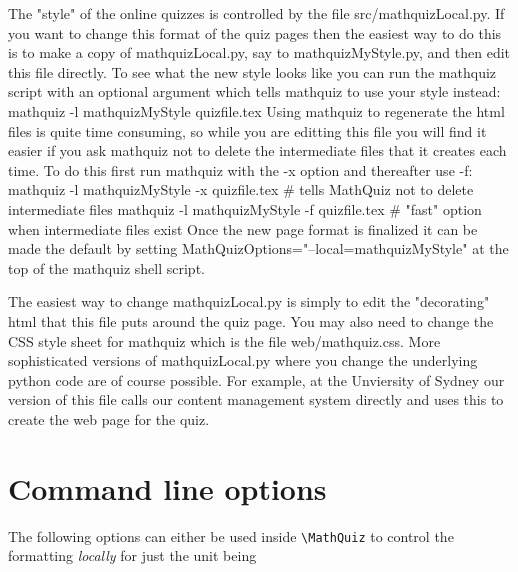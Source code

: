 \documentclass[svgnames]{article}
\def\MathQuiz{\textcolor{blue}{\textsc{MathQuiz}}\xspace}
\begin{document}
The "style" of the online quizzes is controlled by the file src/mathquizLocal.py. If you want to
change this format of the quiz pages then the easiest way to do this is to make a copy of
mathquizLocal.py, say to mathquizMyStyle.py, and then edit this file directly. To see what the
new style looks like you can run the mathquiz script with an optional argument which tells
mathquiz to use your style instead:
    mathquiz -l mathquizMyStyle quizfile.tex
Using mathquiz to regenerate the html files is quite time consuming, so while you are editting this
file you will find it easier if you ask mathquiz not to delete the intermediate files that it
creates each time. To do this first run mathquiz with the -x option and thereafter use -f:
    mathquiz -l mathquizMyStyle -x quizfile.tex   \# tells MathQuiz not to delete intermediate files
    mathquiz -l mathquizMyStyle -f quizfile.tex   \# "fast" option when intermediate files exist
Once the new page format is finalized it can be made the default by setting
    MathQuizOptions="--local=mathquizMyStyle"
at the top of the mathquiz shell script.

The easiest way to change mathquizLocal.py is simply to edit the "decorating" html that this file puts
around the quiz page. You may also need to change the CSS style sheet for mathquiz which is the file
web/mathquiz.css. More sophisticated versions of mathquizLocal.py where you change the underlying
python code are of course possible. For example, at the Unviersity of Sydney our version of this file
calls our content management system directly and uses this to create the web page for the quiz.

    \section{Command line options}

    The following options can either be used inside \Verb|\MathQuiz| to
    control the formatting \textit{locally} for just the unit being
\end{document}

